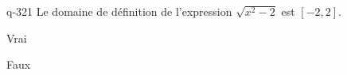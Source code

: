 \begin{truefalse}{q-321}
Le domaine de définition de l'expression $\sqrt{x^2-2}$ est $[-2,2]$.
\item Vrai
\item* Faux
\end{truefalse}

